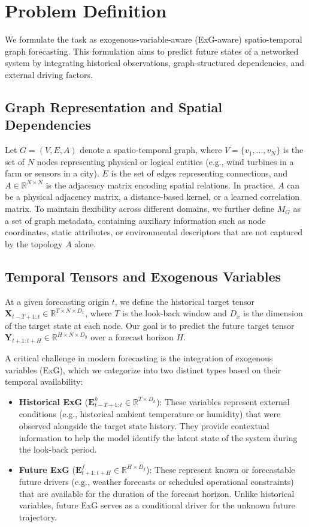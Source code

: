 \section{Problem Definition}
\label{sec:problem_definition}

We formulate the task as exogenous-variable-aware (ExG-aware) spatio-temporal graph forecasting. This formulation aims to predict future states of a networked system by integrating historical observations, graph-structured dependencies, and external driving factors.

\subsection{Graph Representation and Spatial Dependencies}
Let $G=(V, E, A)$ denote a spatio-temporal graph, where $V=\{v_1, \ldots, v_N\}$ is the set of $N$ nodes representing physical or logical entities (e.g., wind turbines in a farm or sensors in a city). $E$ is the set of edges representing connections, and $A \in \mathbb{R}^{N \times N}$ is the adjacency matrix encoding spatial relations. In practice, $A$ can be a physical adjacency matrix, a distance-based kernel, or a learned correlation matrix. To maintain flexibility across different domains, we further define $M_G$ as a set of graph metadata, containing auxiliary information such as node coordinates, static attributes, or environmental descriptors that are not captured by the topology $A$ alone.

\subsection{Temporal Tensors and Exogenous Variables}
At a given forecasting origin $t$, we define the historical target tensor $\mathbf{X}_{t-T+1:t} \in \mathbb{R}^{T \times N \times D_x}$, where $T$ is the look-back window and $D_x$ is the dimension of the target state at each node. Our goal is to predict the future target tensor $\mathbf{Y}_{t+1:t+H} \in \mathbb{R}^{H \times N \times D_y}$ over a forecast horizon $H$.

A critical challenge in modern forecasting is the integration of exogenous variables (ExG), which we categorize into two distinct types based on their temporal availability:
\begin{itemize}
    \item \textbf{Historical ExG} ($\mathbf{E}^{h}_{t-T+1:t} \in \mathbb{R}^{T \times D_h}$): These variables represent external conditions (e.g., historical ambient temperature or humidity) that were observed alongside the target state history. They provide contextual information to help the model identify the latent state of the system during the look-back period.
    \item \textbf{Future ExG} ($\mathbf{E}^{f}_{t+1:t+H} \in \mathbb{R}^{H \times D_f}$): These represent known or forecastable future drivers (e.g., weather forecasts or scheduled operational constraints) that are available for the duration of the forecast horizon. Unlike historical variables, future ExG serves as a conditional driver for the unknown future trajectory.
\end{itemize}

